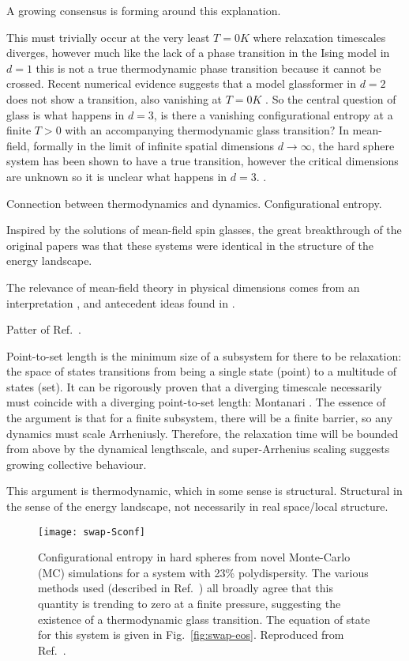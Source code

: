 A growing consensus is forming around this explanation.

This must trivially occur at the very least $T=0\si{K}$ where relaxation timescales diverges, however much like the lack of a phase transition in the Ising model in $d=1$ this is not a true thermodynamic phase transition because it cannot be crossed.
Recent numerical evidence suggests that a model glassformer in $d=2$ does not show a transition, also vanishing at $T=0\si{K}$ \cite{Berthier?}.
So the central question of glass is what happens in $d=3$, is there a vanishing configurational entropy at a finite $T > 0$ with an accompanying thermodynamic glass transition?
In mean-field, formally in the limit of infinite spatial dimensions $d \to \infty$, the hard sphere system has been shown to have a true transition, however the critical dimensions are unknown so it is unclear what happens in $d=3$. \cite{KurchanJSM2012,KurchanJPCB2013,CharbonneauNC2014,CharbonneauJSM2014}.

Connection between thermodynamics and dynamics.
Configurational entropy.

Inspired by the solutions of mean-field spin glasses, the great breakthrough of the original papers was that these systems were identical in the structure of the energy landscape.

The relevance of mean-field theory in physical dimensions comes from an interpretation \cite{KirkpatrickPRB1987, KirkpatrickPRA1989}, and antecedent ideas found in \cite{AdamJCP1965}.

Patter of Ref.\ \cite{BouchaudJCP2004}.

Point-to-set length is the minimum size of a subsystem for there to be relaxation: the space of states transitions from being a single state (point) to a multitude of states (set).
It can be rigorously proven that a diverging timescale necessarily must coincide with a diverging point-to-set length: Montanari \cite{MontanariJSP2006}.
The essence of the argument is that for a finite subsystem, there will be a finite barrier, so any dynamics must scale Arrheniusly.
Therefore, the relaxation time will be bounded from above by the dynamical lengthscale, and super-Arrhenius scaling suggests growing collective behaviour.

This argument is thermodynamic, which in some sense is structural.
Structural in the sense of the energy landscape, not necessarily in real space/local structure.

\begin{SCfigure}
  \texttt{[image: swap-Sconf]}
  \caption[Configurational entropy in hard spheres from Monte-Carlo simulations]{
    Configurational entropy in hard spheres from novel Monte-Carlo (MC) simulations for a system with 23\% polydispersity.
    The various methods used (described in Ref.\ \cite{BerthierPNAS2017}) all broadly agree that this quantity is trending to zero at a finite pressure, suggesting the existence of a thermodynamic glass transition.
    The equation of state for this system is given in Fig.\ \ref{fig:swap-eos}.
    Reproduced from Ref.\ \cite{BerthierPNAS2017}.
  }
\end{SCfigure}

